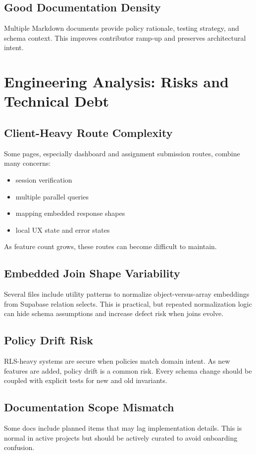 \documentclass[11pt]{article}
\begin{document}
\subsection{Good Documentation Density}
Multiple Markdown documents provide policy rationale, testing strategy, and schema context. This improves contributor ramp-up and preserves architectural intent.

\section{Engineering Analysis: Risks and Technical Debt}
\subsection{Client-Heavy Route Complexity}
Some pages, especially dashboard and assignment submission routes, combine many concerns:
\begin{itemize}[leftmargin=*]
  \item session verification
  \item multiple parallel queries
  \item mapping embedded response shapes
  \item local UX state and error states
\end{itemize}
As feature count grows, these routes can become difficult to maintain.

\subsection{Embedded Join Shape Variability}
Several files include utility patterns to normalize object-versus-array embeddings from Supabase relation selects. This is practical, but repeated normalization logic can hide schema assumptions and increase defect risk when joins evolve.

\subsection{Policy Drift Risk}
RLS-heavy systems are secure when policies match domain intent. As new features are added, policy drift is a common risk. Every schema change should be coupled with explicit tests for new and old invariants.

\subsection{Documentation Scope Mismatch}
Some docs include planned items that may lag implementation details. This is normal in active projects but should be actively curated to avoid onboarding confusion.
\end{document}

